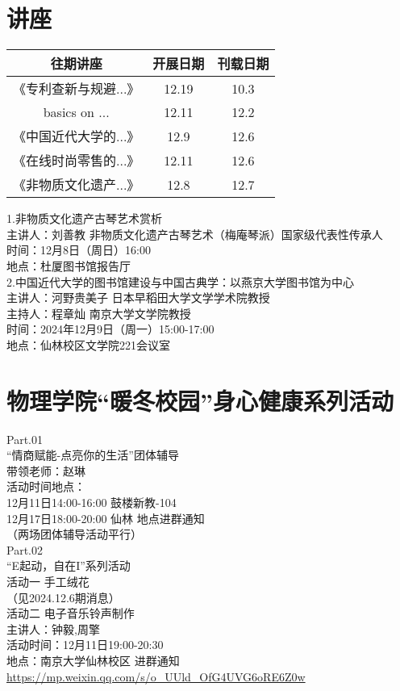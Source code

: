 \documentclass[letterpaper, 12pt]{article}
\begin{document}
\begin{multicols}{2}

\section{讲座}
\begin{tabular}{|c|c|c|}
    \hline
    往期讲座 & 开展日期 & 刊载日期\\
    \hline\hline
    《专利查新与规避...》 & 12.19 & 10.3\\
    basics on ... & 12.11 & 12.2\\
    《中国近代大学的...》 & 12.9 & 12.6\\
    《在线时尚零售的...》 & 12.11 & 12.6\\
    《非物质文化遗产...》 & 12.8 & 12.7\\
    \hline
\end{tabular}

1.非物质文化遗产古琴艺术赏析\\
主讲人：刘善教 非物质文化遗产古琴艺术（梅庵琴派）国家级代表性传承人\\
时间：12月8日（周日）16:00\\
地点：杜厦图书馆报告厅\\

2.中国近代大学的图书馆建设与中国古典学：以燕京大学图书馆为中心\\
主讲人：河野贵美子 日本早稻田大学文学学术院教授\\
主持人：程章灿 南京大学文学院教授 \\
时间：2024年12月9日（周一）15:00-17:00\\
地点：仙林校区文学院221会议室\\

\section{物理学院“暖冬校园”身心健康系列活动}
Part.01\\
“情商赋能-点亮你的生活”团体辅导\\
带领老师：赵琳\\
活动时间地点：\\
12月11日14:00-16:00 鼓楼新教-104\\
12月17日18:00-20:00 仙林 地点进群通知\\
（两场团体辅导活动平行）\\
Part.02\\
“E起动，自在I”系列活动\\
活动一 手工绒花\\
（见2024.12.6期消息）\\
活动二 电子音乐铃声制作\\
主讲人：钟毅,周擎\\
活动时间：12月11日19:00-20:30\\
地点：南京大学仙林校区 进群通知\\
\url{https://mp.weixin.qq.com/s/o_UUld_OfG4UVG6oRE6Z0w}


\end{multicols}
\end{document}
